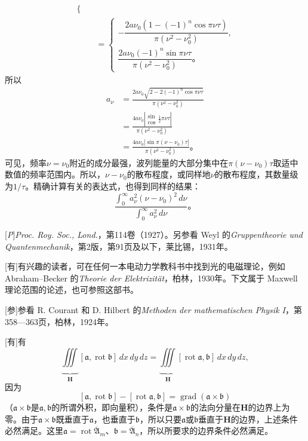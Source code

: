 \documentclass[fontsize=13pt,twoside,openany,headings=normal,parskip=false,bookmarkpackage=false,DIV=calc]{scrbook}
\begin{document}
{\begin{align*}
\begin{cases}
\end{cases}\\
&=\begin{cases}
-\dfrac{2a\nu_0(1-(-1)^n\cos\pi\nu\tau)}{\pi(\nu^2-\nu_0^2)},\\[6pt]
\dfrac{2a\nu_0(-1)^n\sin\pi\nu\tau}{\pi(\nu^2-\nu_0^2)}\text{。}
\end{cases}
\end{align*}
所以
\begin{align*}
a_\nu&=\frac{2a\nu_0\sqrt{2-2(-1)^n\cos\pi\nu\tau}}{\pi(\nu^2-\nu_0^2)}\\
&=\frac{4a\nu_0\left|\begin{matrix}\sin\\\cos\end{matrix}\frac12\pi\nu\tau\right|}{\pi(\nu^2-\nu_0^2)}\\
&=\frac{4a\nu_0|\sin\pi(\nu-\nu_0)\tau|}{\pi(\nu^2-\nu_0^2)}\text{。}
\end{align*}
可见，频率$\nu=\nu_0$附近的成分最强，波列能量的大部分集中在$\pi(\nu-\nu_0)\tau$取适中数值的频率范围内。所以，$\nu-\nu_0$的散布程度，或同样地$\nu$的散布程度，其数量级为$1/\tau$。精确计算有关的表达式，也得到同样的结果：
\[
\frac{\int_0^\infty a_\nu^2(\nu-\nu_0)^2\,d\nu}{\int_0^\infty a_\nu^2\,d\nu}\text{。}
\]}

[\emph{P}]{\emph{Proc. Roy. Soc., Lond.}，第114卷（1927）。另参看 Weyl 的\emph{Gruppentheorie und Quantenmechanik}，第2版，第91页及以下，莱比锡，1931年。}

[有]{有兴趣的读者，可在任何一本电动力学教科书中找到光的电磁理论，例如 Abraham--Becker 的\emph{Theorie der Elektrizität}，柏林，1930年。下文属于 Maxwell 理论范围的论述，也可参照这部书。}

[参]{参看 R. Courant 和 D. Hilbert 的\emph{Methoden der mathematischen Physik I}，第358—363页，柏林，1924年。}

[有]{有
\[
\underbrace{\iiint}_{\boldsymbol H}[\mathfrak a,\operatorname{rot}\mathfrak b]\,dx\,dy\,dz
=\underbrace{\iiint}_{\boldsymbol H}[\operatorname{rot}\mathfrak a,\mathfrak b]\,dx\,dy\,dz,
\]\hypertarget{origpage-253}{}\label{origpage-253}因为
\[
[\mathfrak a,\operatorname{rot}\mathfrak b]-[\operatorname{rot}\mathfrak a,\mathfrak b]
=\operatorname{grad}(\mathfrak a\times\mathfrak b)
\]
（$\mathfrak a\times\mathfrak b$是$\mathfrak a,\allowbreak \mathfrak b$的所谓外积，即向量积），条件是$\mathfrak a\times\mathfrak b$的法向分量在$\boldsymbol H$的边界上为零。由于$\mathfrak a\times\mathfrak b$既垂直于$\mathfrak a$，也垂直于$\mathfrak b$，所以只要$\mathfrak a$或$\mathfrak b$垂直于$\boldsymbol H$的边界，上述条件必然满足。这里$\mathfrak a=\operatorname{rot}\overline{\mathfrak A}_m$、$\mathfrak b=\overline{\mathfrak A}_n$，所以所要求的边界条件必然满足。}
\end{document}
